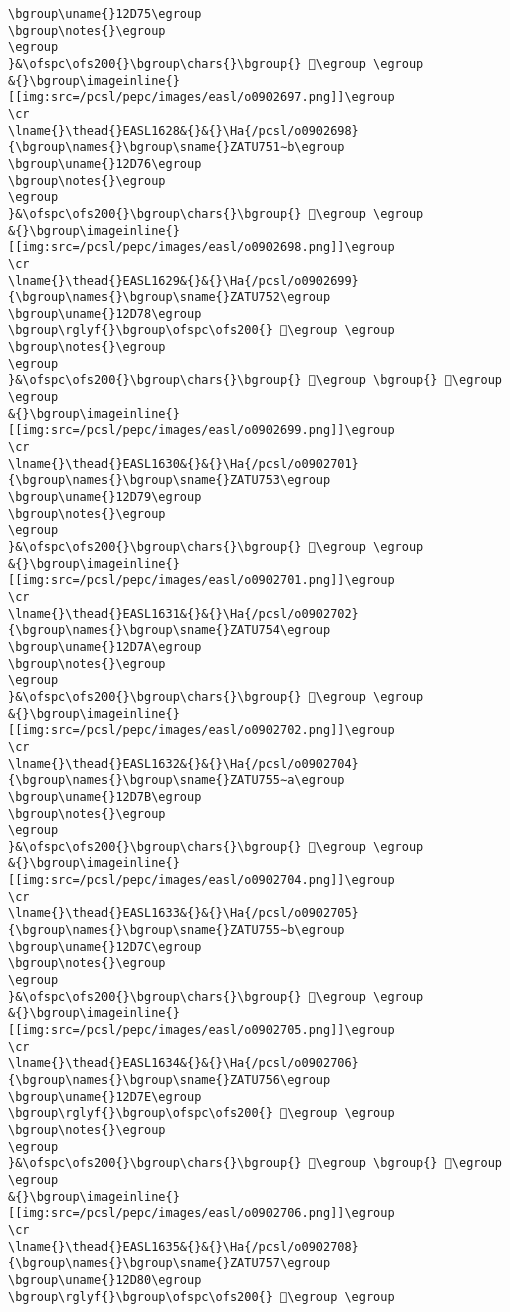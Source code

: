 \begin{verbatim}
\bgroup\uname{}12D75\egroup
\bgroup\notes{}\egroup
\egroup
}&\ofspc\ofs200{}\bgroup\chars{}\bgroup{} 𒵵\egroup \egroup
&{}\bgroup\imageinline{}[[img:src=/pcsl/pepc/images/easl/o0902697.png]]\egroup
\cr
\lname{}\thead{}EASL1628&{}&{}\Ha{/pcsl/o0902698}{\bgroup\names{}\bgroup\sname{}ZATU751∼b\egroup
\bgroup\uname{}12D76\egroup
\bgroup\notes{}\egroup
\egroup
}&\ofspc\ofs200{}\bgroup\chars{}\bgroup{} 𒵶\egroup \egroup
&{}\bgroup\imageinline{}[[img:src=/pcsl/pepc/images/easl/o0902698.png]]\egroup
\cr
\lname{}\thead{}EASL1629&{}&{}\Ha{/pcsl/o0902699}{\bgroup\names{}\bgroup\sname{}ZATU752\egroup
\bgroup\uname{}12D78\egroup
\bgroup\rglyf{}\bgroup\ofspc\ofs200{} 𒵸\egroup \egroup
\bgroup\notes{}\egroup
\egroup
}&\ofspc\ofs200{}\bgroup\chars{}\bgroup{} 𒵷\egroup \bgroup{} 𒵸\egroup \egroup
&{}\bgroup\imageinline{}[[img:src=/pcsl/pepc/images/easl/o0902699.png]]\egroup
\cr
\lname{}\thead{}EASL1630&{}&{}\Ha{/pcsl/o0902701}{\bgroup\names{}\bgroup\sname{}ZATU753\egroup
\bgroup\uname{}12D79\egroup
\bgroup\notes{}\egroup
\egroup
}&\ofspc\ofs200{}\bgroup\chars{}\bgroup{} 𒵹\egroup \egroup
&{}\bgroup\imageinline{}[[img:src=/pcsl/pepc/images/easl/o0902701.png]]\egroup
\cr
\lname{}\thead{}EASL1631&{}&{}\Ha{/pcsl/o0902702}{\bgroup\names{}\bgroup\sname{}ZATU754\egroup
\bgroup\uname{}12D7A\egroup
\bgroup\notes{}\egroup
\egroup
}&\ofspc\ofs200{}\bgroup\chars{}\bgroup{} 𒵺\egroup \egroup
&{}\bgroup\imageinline{}[[img:src=/pcsl/pepc/images/easl/o0902702.png]]\egroup
\cr
\lname{}\thead{}EASL1632&{}&{}\Ha{/pcsl/o0902704}{\bgroup\names{}\bgroup\sname{}ZATU755∼a\egroup
\bgroup\uname{}12D7B\egroup
\bgroup\notes{}\egroup
\egroup
}&\ofspc\ofs200{}\bgroup\chars{}\bgroup{} 𒵻\egroup \egroup
&{}\bgroup\imageinline{}[[img:src=/pcsl/pepc/images/easl/o0902704.png]]\egroup
\cr
\lname{}\thead{}EASL1633&{}&{}\Ha{/pcsl/o0902705}{\bgroup\names{}\bgroup\sname{}ZATU755∼b\egroup
\bgroup\uname{}12D7C\egroup
\bgroup\notes{}\egroup
\egroup
}&\ofspc\ofs200{}\bgroup\chars{}\bgroup{} 𒵼\egroup \egroup
&{}\bgroup\imageinline{}[[img:src=/pcsl/pepc/images/easl/o0902705.png]]\egroup
\cr
\lname{}\thead{}EASL1634&{}&{}\Ha{/pcsl/o0902706}{\bgroup\names{}\bgroup\sname{}ZATU756\egroup
\bgroup\uname{}12D7E\egroup
\bgroup\rglyf{}\bgroup\ofspc\ofs200{} 𒵾\egroup \egroup
\bgroup\notes{}\egroup
\egroup
}&\ofspc\ofs200{}\bgroup\chars{}\bgroup{} 𒵽\egroup \bgroup{} 𒵾\egroup \egroup
&{}\bgroup\imageinline{}[[img:src=/pcsl/pepc/images/easl/o0902706.png]]\egroup
\cr
\lname{}\thead{}EASL1635&{}&{}\Ha{/pcsl/o0902708}{\bgroup\names{}\bgroup\sname{}ZATU757\egroup
\bgroup\uname{}12D80\egroup
\bgroup\rglyf{}\bgroup\ofspc\ofs200{} 𒶀\egroup \egroup

\end{verbatim}
